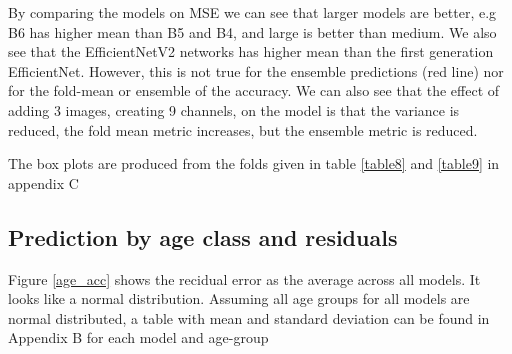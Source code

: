 \documentclass[10pt,letterpaper]{article}
\begin{document}
By comparing the models on MSE we can see that larger models are better, e.g B6 has 
higher mean than B5 and B4, and large is better than medium. 
We also see that the EfficientNetV2 networks has higher  mean than the
first generation EfficientNet. However, this is not true for the ensemble
predictions (red line) nor for the fold-mean or ensemble of the accuracy.
We can also see that the effect of adding 3 images, creating 9 channels, on the
model is that the variance is reduced, the fold mean metric increases,
but the ensemble metric is reduced.

The box plots are produced from the folds given in table \ref{table8} and \ref{table9} in appendix C

\subsection*{Prediction by age class and residuals}

Figure \ref{age_acc} shows the recidual error as the
average across all models. It looks like a normal distribution.
Assuming all age groups for all models are normal distributed,
a table with mean and standard deviation can be found in Appendix B for
each model and age-group
\end{document}

